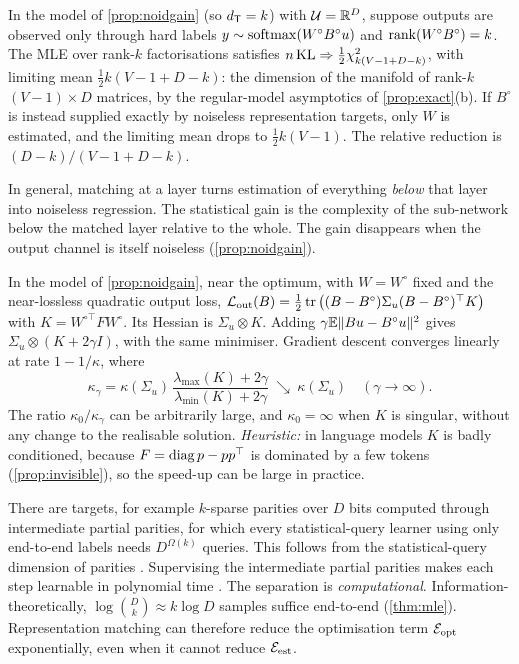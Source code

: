 \begin{proposition}\label{prop:repr-count}
\Kn In the model of \cref{prop:noidgain} (so $d_{\mathsf{T}}=k$) with $\mathcal U=\mathbb{R}^D$, suppose outputs are observed only through
hard labels $y\sim\operatorname{softmax}(W^\circ B^\circ u)$ and $\operatorname{rank}(W^\circ B^\circ)=k$. The MLE over rank-$k$ factorisations
satisfies $n\,\mathrm{KL}\Rightarrow\frac12\chi^2_{k(V-1+D-k)}$, with limiting mean $\frac12k(V-1+D-k)$: the dimension of the manifold of rank-$k$ $(V-1)\times D$
matrices, by the regular-model asymptotics of \cref{prop:exact}(b). If $B^\circ$ is instead supplied exactly
by noiseless representation targets, only $W$ is estimated, and the limiting mean drops to $\frac12k(V-1)$. The relative
reduction is $(D-k)/(V-1+D-k)$.
\end{proposition}
\noindent
In general, matching at a layer turns estimation of everything \emph{below} that layer into noiseless
regression. The statistical gain is the complexity of the sub-network below the matched layer relative
to the whole. The gain disappears when the output channel is itself noiseless (\cref{prop:noidgain}).

\begin{proposition}\label{prop:precond}
\Mo In the model of \cref{prop:noidgain}, near the optimum, with $W=W^\circ$ fixed and the near-lossless
quadratic output loss,
$\mathcal{L}_{\mathrm{out}}(B)=\frac12\operatorname{tr}\big((B-B^\circ)\Sigma_u(B-B^\circ)^\top K\big)$ with $K=W^{\circ\top}FW^\circ$. Its Hessian is
$\Sigma_u\otimes K$. Adding $\gamma\mathbb{E}\|Bu-B^\circ u\|^2$ gives $\Sigma_u\otimes(K+2\gamma I)$, with the same minimiser.
Gradient descent converges linearly at rate $1-1/\kappa$, where
\[
\kappa_\gamma=\kappa(\Sigma_u)\,\frac{\lambda_{\max}(K)+2\gamma}{\lambda_{\min}(K)+2\gamma}\ \searrow\ \kappa(\Sigma_u)\quad(\gamma\to\infty).
\]
The ratio $\kappa_0/\kappa_\gamma$ can be arbitrarily large, and $\kappa_0=\infty$ when $K$ is singular, without any change
to the realisable solution. \emph{Heuristic:} in language models $K$ is badly conditioned, because
$F=\operatorname{diag} p-pp^\top$ is dominated by a few tokens (\cref{prop:invisible}), so the speed-up can be large in
practice.
\end{proposition}

\begin{proposition}\label{prop:parity}
\Kn There are targets, for example $k$-sparse parities over $D$ bits computed through intermediate partial
parities, for which every statistical-query learner using only end-to-end labels needs $D^{\Omega(k)}$
queries. This follows from the statistical-query dimension of parities
\citep{blum1994weakly,kearns1998efficient}. Supervising the intermediate partial parities makes each step learnable
in polynomial time \citep{wies2023subtask}. The separation is \emph{computational}. Information-theoretically,
$\log\binom Dk\approx k\log D$ samples suffice end-to-end (\cref{thm:mle}). Representation matching can
therefore reduce the optimisation term $\mathcal{E}_{\mathrm{opt}}$ exponentially, even when it cannot reduce $\mathcal{E}_{\mathrm{est}}$.
\end{proposition}

